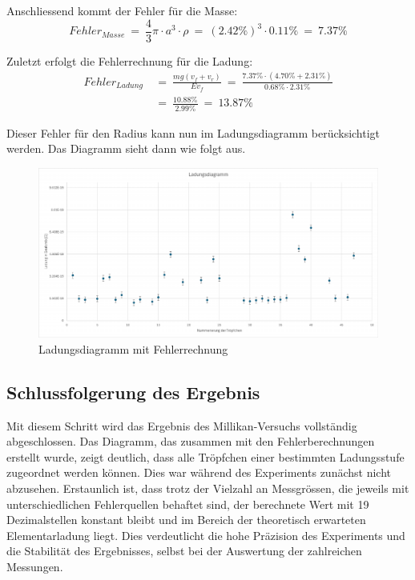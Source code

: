 \noindent Anschliessend kommt der Fehler für die Masse:
\begin{equation*}\label{eq:fehlerMasse}
	Fehler_{Masse} \ = \ \frac{4}{3} \pi \cdot a^3 \cdot \rho \ = \ (2.42\%)^3 \cdot 0.11\% \ = \ 7.37\%
\end{equation*}

\noindent Zuletzt erfolgt die Fehlerrechnung für die Ladung:
\begin{equation*}
	\begin{split}
		Fehler_{Ladung} & \ = \ \frac{mg(v_f + v_r)}{Ev_f} \ = \ \frac{7.37\% \cdot (4.70\% + 2.31\%)}{0.68\% \cdot 2.31\%} \\
		& \ = \ \frac{10.88\%}{2.99\%} \ = \ 13.87\%	
	\end{split}
\end{equation*}

\noindent Dieser Fehler für den Radius kann nun im Ladungsdiagramm berücksichtigt werden. Das Diagramm sieht dann wie folgt aus.

\begin{figure}[h]
	\centering
	\includegraphics[width=\textwidth]{bilder/pdf/LadungsdiagrammMit.pdf}
	\caption{Ladungsdiagramm mit Fehlerrechnung}
	\label{fig:ladungsdiagrammMFehlerrechnung}
\end{figure}

\subsection{Schlussfolgerung des Ergebnis}\label{sub:schlussfolgerung}
Mit diesem Schritt wird das Ergebnis des Millikan-Versuchs vollständig abgeschlossen. Das Diagramm, das zusammen mit den Fehlerberechnungen erstellt wurde, zeigt deutlich, dass alle Tröpfchen einer bestimmten Ladungsstufe zugeordnet werden können. Dies war während des Experiments zunächst nicht abzusehen. Erstaunlich ist, dass trotz der Vielzahl an Messgrössen, die jeweils mit unterschiedlichen Fehlerquellen behaftet sind, der berechnete Wert mit 19 Dezimalstellen konstant bleibt und im Bereich der theoretisch erwarteten Elementarladung liegt. Dies verdeutlicht die hohe Präzision des Experiments und die Stabilität des Ergebnisses, selbst bei der Auswertung der zahlreichen Messungen. \\

